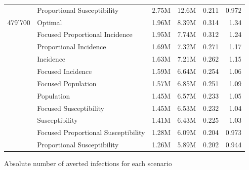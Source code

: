 \begin{fwtable}
\begin{tabular}{llrrrr}
        & Proportional Susceptibility &   2.75M &    12.6M &          0.211 &       0.972 \\
479'700 & Optimal &   1.96M &    8.39M &          0.314 &        1.34 \\
        & Focused Proportional Incidence &   1.95M &    7.74M &          0.312 &        1.24 \\
        & Proportional Incidence &   1.69M &    7.32M &          0.271 &        1.17 \\
        & Incidence &   1.63M &    7.21M &          0.262 &        1.15 \\
        & Focused Incidence &   1.59M &    6.64M &          0.254 &        1.06 \\
        & Focused Population &   1.57M &    6.85M &          0.251 &        1.09 \\
        & Population &   1.45M &    6.57M &          0.233 &        1.05 \\
        & Focused Susceptibility &   1.45M &    6.53M &          0.232 &        1.04 \\
        & Susceptibility &   1.41M &    6.43M &          0.225 &        1.03 \\
        & Focused Proportional Susceptibility &   1.28M &    6.09M &          0.204 &       0.973 \\
        & Proportional Susceptibility &   1.26M &    5.89M &          0.202 &       0.944 \\
\bottomrule
\end{tabular}
\caption{Absolute number of averted infections for each scenario}
\label{table:all_strat}
\end{fwtable}

